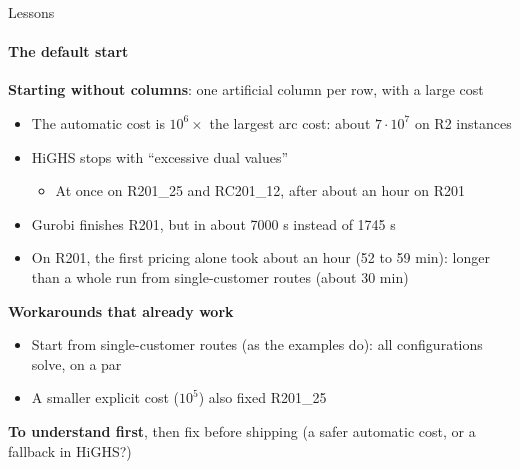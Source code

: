 \documentclass[aspectratio=169]{beamer}
\begin{document}
\begin{frame}{Lessons}
  \framesubtitle{The default start}

  \textbf{Starting without columns}: one artificial column per row, with a large cost
  \begin{itemize}
    \item The automatic cost is $10^6 \times$ the largest arc cost: about $7 \cdot 10^7$ on R2 instances
    \item HiGHS stops with ``excessive dual values''
      \begin{itemize}
        \item At once on R201\_25 and RC201\_12, after about an hour on R201
      \end{itemize}
    \item Gurobi finishes R201, but in about 7000 s instead of 1745 s
    \item On R201, the first pricing alone took about an hour (52 to 59 min):
      longer than a whole run from single-customer routes (about 30 min)
  \end{itemize}

  \vspace{0.4em}
  \textbf{Workarounds that already work}
  \begin{itemize}
    \item Start from single-customer routes (as the examples do): all configurations solve, on a par
    \item A smaller explicit cost ($10^5$) also fixed R201\_25
  \end{itemize}

  \vspace{0.4em}
  \textbf{To understand first}, then fix before shipping (a safer automatic cost, or a fallback in HiGHS?)
\end{frame}
\end{document}
